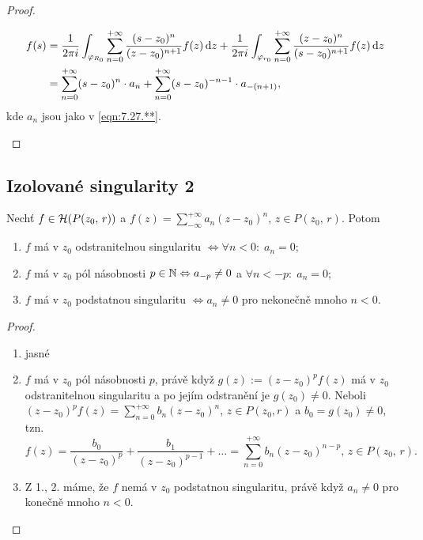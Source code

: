 \begin{proof}
\begin{enumerate}
\begin{equation}
    \begin{aligned}
        f(s)&=\frac{1}{2 \pi i}\int_{\varphi_{R_0}}\sum\limits_{n=0}^{+\infty}\frac{(s-z_0)^n}{(z-z_0)^{n+1}}f(z) \mathop{}\!\mathrm{d} z+\frac{1}{2 \pi i}\int_{\varphi_{r_0}}\sum\limits_{n=0}^{+\infty}\frac{(z-z_0)^n}{(s-z_0)^{n+1}}f(z) \mathop{}\!\mathrm{d} z \\
        &=\sum\limits_{n=0}^{+\infty}(s-z_0)^n\cdot a_n+\sum\limits_{n=0}^{+\infty}(s-z_0)^{-n-1}\cdot a_{-(n+1)},    
    \end{aligned}
\end{equation}
 kde $a_n$ jsou jako v \cref{eqn:7.27.**}.
\end{enumerate}
\end{proof}

\subsection{Izolované singularity 2}
\begin{theorem}
Nechť $f \in \operatorname{\mathcal{H}} (P(z_0,\,r))$ a $f(z)=\sum\limits_{-\infty}^{+\infty}a_n(z-z_0)^n$, $z \in P(z_0,\,r)$. Potom
\begin{enumerate}
    \item $f$ má v $z_0$ odstranitelnou singularitu $\Leftrightarrow \forall n<0:\;a_n=0$; 
    \item $f$ má v $z_0$ pól násobnosti $p \in \operatorname{\mathbb{N}}\Leftrightarrow a_{-p} \neq 0$ a $\forall n<-p: \;a_n=0$; 
    \item $f$ má v $z_0$ podstatnou singularitu $\Leftrightarrow a_n \neq 0$ pro nekonečně mnoho $n<0$.
\end{enumerate}
\end{theorem}

\begin{proof}
\mbox{}
\begin{enumerate}
    \item jasné
    \item $f$ má v $z_0$ pól násobnosti $p$, právě když $g(z):=(z-z_0)^pf(z)$ má v $z_0$ odstranitelnou singularitu a po jejím odstranění je $g(z_0) \neq 0$. Neboli $(z-z_0)^pf(z)=\sum\limits_{n=0}^{+\infty}b_n(z-z_0)^n$, $z \in P(z_0,r)$ a $b_0=g(z_0) \neq 0$, tzn. 
    $$
    f(z)=\frac{b_0}{(z-z_0)^p}+\frac{b_1}{(z-z_0)^{p-1}}+ \dots=\sum\limits_{n=0}^{+\infty}b_n(z-z_0)^{n-p} \text{, } z \in P(z_0,\,r)\text{.}
    $$
    \item Z 1., 2. máme, že $f$ nemá v $z_0$ podstatnou singularitu, právě když $a_n \neq 0$ pro konečně mnoho $n<0$.
\end{enumerate}
\end{proof}

